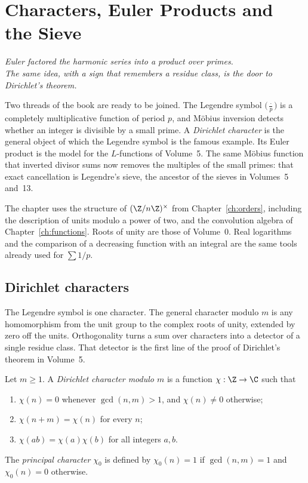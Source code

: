 \chapter{Characters, Euler Products and the Sieve}\label{ch:characters}

\begin{center}\itshape
Euler factored the harmonic series into a product over primes.\\
The same idea, with a sign that remembers a residue class, is the door to Dirichlet's theorem.
\end{center}

Two threads of the book are ready to be joined. The Legendre symbol $\bigl(\frac{\cdot}{p}\bigr)$ is a completely multiplicative function of period $p$, and M\"obius inversion detects whether an integer is divisible by a small prime. A \emph{Dirichlet character} is the general object of which the Legendre symbol is the famous example. Its Euler product is the model for the $L$-functions of Volume~5. The same M\"obius function that inverted divisor sums now removes the multiples of the small primes: that exact cancellation is Legendre's sieve, the ancestor of the sieves in Volumes~5 and~13.

The chapter uses the structure of $(\Z/n\Z)^\times$ from Chapter~\ref{ch:orders}, including the description of units modulo a power of two, and the convolution algebra of Chapter~\ref{ch:functions}. Roots of unity are those of Volume~0. Real logarithms and the comparison of a decreasing function with an integral are the same tools already used for $\sum 1/p$.

\section{Dirichlet characters}

The Legendre symbol is one character. The general character modulo $m$ is any homomorphism from the unit group to the complex roots of unity, extended by zero off the units. Orthogonality turns a sum over characters into a detector of a single residue class. That detector is the first line of the proof of Dirichlet's theorem in Volume~5.

\begin{definition}\label{def:t1-character}
Let $m\ge1$. A \emph{Dirichlet character modulo $m$} is a function $\chi:\Z\to\C$ such that
\begin{enumerate}[label=(\roman*)]
\item $\chi(n)=0$ whenever $\gcd(n,m)>1$, and $\chi(n)\ne0$ otherwise;
\item $\chi(n+m)=\chi(n)$ for every $n$;
\item $\chi(ab)=\chi(a)\chi(b)$ for all integers $a,b$.
\end{enumerate}
The \emph{principal character} $\chi_0$ is defined by $\chi_0(n)=1$ if $\gcd(n,m)=1$ and $\chi_0(n)=0$ otherwise.
\end{definition}

